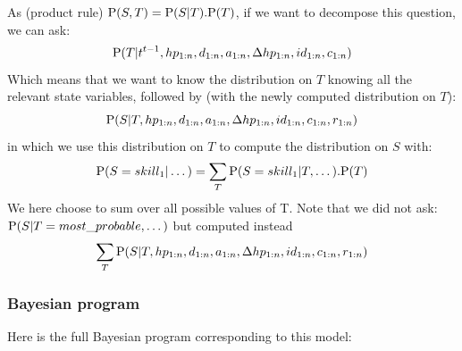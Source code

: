As (product rule) $\mathrm{P}(S,T) = \mathrm{P}(S|T).\mathrm{P}(T)$, if we want to decompose this question, we can ask:
$$\mathrm{P}(T | t^{t-1}, hp_{1:n},d_{1:n}, a_{1:n}, \Delta hp_{1:n}, id_{1:n}, c_{1:n})$$ 
Which means that we want to know the distribution on $T$ knowing all the relevant state variables, followed by (with the newly computed distribution on $T$):
$$\mathrm{P}(S | T, hp_{1:n},d_{1:n}, a_{1:n}, \Delta hp_{1:n}, id_{1:n}, c_{1:n}, r_{1:n})$$ 
in which we use this distribution on $T$ to compute the distribution on $S$ with:
$$\mathrm{P}(S=skill_1 | \dots) = \sum_T \mathrm{P}(S=skill_1 | T, \dots).\mathrm{P}(T)$$
We here choose to sum over all possible values of T. Note that we did not ask:\\
$\mathrm{P}(S|T=most\_probable , \dots)$ but computed instead
$$\sum_T \mathrm{P}(S|T,hp_{1:n},d_{1:n}, a_{1:n}, \Delta hp_{1:n}, id_{1:n}, c_{1:n}, r_{1:n})$$


\subsubsection{Bayesian program}
Here is the full Bayesian program corresponding to this model:

